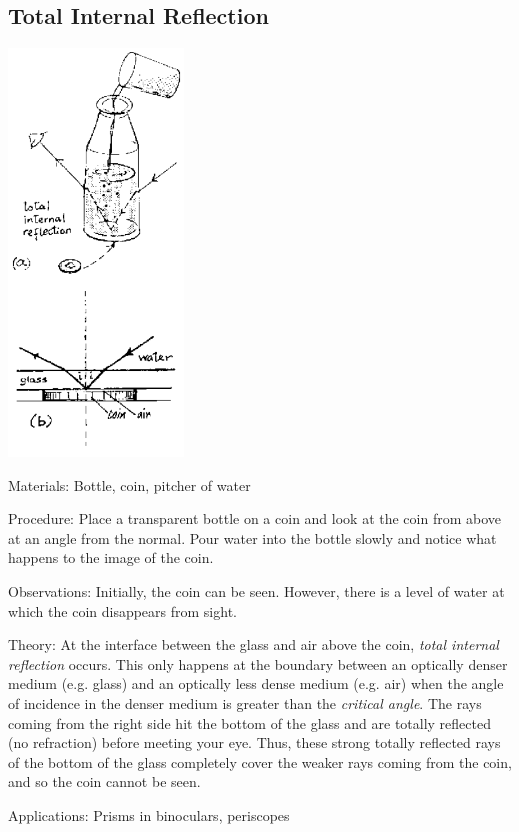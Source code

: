 \begin{multicols}{2}
\subsection{Total Internal Reflection}

\begin{center}
\includegraphics[width=0.35\textwidth]{./img/source/total-int-refl.png}
\end{center}

\begin{description*}
\item[Materials:]{Bottle, coin, pitcher of water}
\item[Procedure:]{Place a transparent bottle on a coin and look at the coin from above at an angle from the normal. Pour water into the bottle slowly and notice what happens to the image of the coin.}
\item[Observations:]{Initially, the coin can be seen. However, there is a level of water at which the coin disappears from sight.}
\item[Theory:]{At the interface between the glass and air above the coin, \emph{total internal reflection} occurs. This only happens at the boundary between an optically denser medium (e.g. glass) and an optically less dense medium (e.g. air) when the angle of incidence in the denser medium is greater than the \emph{critical angle}. The rays coming from the right side hit the bottom of the glass and are totally reflected (no refraction) before meeting your eye. Thus, these strong totally reflected rays of the bottom of the glass completely cover the weaker rays coming from the coin, and so the coin cannot be seen.}
\item[Applications:]{Prisms in binoculars, periscopes}
\end{description*}


\end{multicols}
